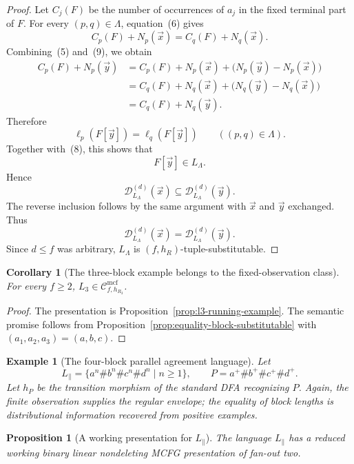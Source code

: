 \documentclass[11pt,a4paper]{article}
\newtheorem{proposition}[theorem]{Proposition}
\newtheorem{corollary}[theorem]{Corollary}
\newtheorem{example}[theorem]{Example}
\theoremstyle{remark}
\newcommand{\Cmcf}[2]{\mathcal{C}^{\mathrm{mcf}}_{#1,#2}}
\newcommand{\D}{\mathcal{D}}
\newcommand{\tuple}[1]{\vec{#1}}
\begin{document}
\begin{proof}
Let \(C_j(F)\) be the number of occurrences of \(a_j\) in the fixed terminal
part of \(F\).  For every \((p,q)\in\Lambda\), equation~(6) gives
\[
  C_p(F)+N_p(\tuple x)
  =
  C_q(F)+N_q(\tuple x).
  \tag{9}
\]
Combining~(5) and~(9), we obtain
\[
\begin{aligned}
  C_p(F)+N_p(\tuple y)
  &=
  C_p(F)+N_p(\tuple x)
    +\bigl(N_p(\tuple y)-N_p(\tuple x)\bigr)
  \\
  &=
  C_q(F)+N_q(\tuple x)
    +\bigl(N_q(\tuple y)-N_q(\tuple x)\bigr)
  \\
  &=
  C_q(F)+N_q(\tuple y).
\end{aligned}
\]
Therefore
\[
  \ell_p(F[\tuple y])
  =
  \ell_q(F[\tuple y])
  \qquad ((p,q)\in\Lambda).
\]
Together with~(8), this shows that
\[
  F[\tuple y]\in L_\Lambda.
\]
Hence
\[
  \D_{L_\Lambda}^{(d)}(\tuple x)
  \subseteq
  \D_{L_\Lambda}^{(d)}(\tuple y).
\]
The reverse inclusion follows by the same argument with \(\tuple x\) and
\(\tuple y\) exchanged.  Thus
\[
  \D_{L_\Lambda}^{(d)}(\tuple x)
  =
  \D_{L_\Lambda}^{(d)}(\tuple y).
\]
Since \(d\le f\) was arbitrary, \(L_\Lambda\) is
\((f,h_R)\)-tuple-substitutable.
\end{proof}



\begin{corollary}[The three-block example belongs to the fixed-observation class]
\label{cor:l3-in-fixed-observation-class}
For every \(f\ge2\), \(L_3\in\Cmcf{f}{h_{R_3}}\).
\end{corollary}

\begin{proof}
The presentation is Proposition~\ref{prop:l3-running-example}.  The semantic
promise follows from Proposition~\ref{prop:equality-block-substitutable}
with \((a_1,a_2,a_3)=(a,b,c)\).
\end{proof}

\begin{example}[The four-block parallel agreement language]
\label{ex:parallel-language}
Let
\[
  L_{\parallel}=\{a^n\#b^n\#c^n\#d^n\mid n\ge1\},
  \qquad P=a^+\#b^+\#c^+\#d^+ .
\]
Let \(h_P\) be the transition morphism of the standard DFA recognizing \(P\).
Again, the finite observation supplies the regular envelope; the equality of
block lengths is distributional information recovered from positive examples.
\end{example}

\begin{proposition}[A working presentation for \(L_{\parallel}\)]
\label{prop:parallel-running-example}
The language \(L_{\parallel}\) has a reduced working binary linear nondeleting
MCFG presentation of fan-out two.
\end{proposition}
\end{document}
